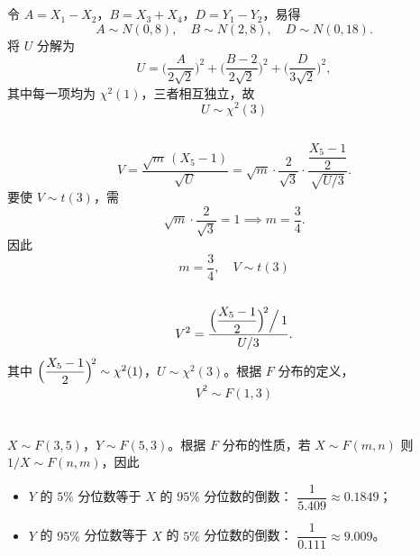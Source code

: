 \documentclass[12pt,a4paper]{article}
\begin{document}
\section{}

\subsection{}

令 $A=X_{1}-X_{2}$，$B=X_{3}+X_{4}$，$D=Y_{1}-Y_{2}$，易得
\[
  A\sim N(0,8),\quad B\sim N(2,8),\quad D\sim N(0,18).
\]
将 $U$ 分解为
\[
  U=\biggl(\frac{A}{2\sqrt{2}}\biggr)^{\!2}
   +\biggl(\frac{B-2}{2\sqrt{2}}\biggr)^{\!2}
   +\biggl(\frac{D}{3\sqrt{2}}\biggr)^{\!2},
\]
其中每一项均为 $\chi^{2}(1)$，三者相互独立，故
\[
  \boxed{U\sim\chi^{2}(3)}
\]

\subsection{}

\[
  V=\frac{\sqrt{m}\,(X_{5}-1)}{\sqrt{U}}
  =\sqrt{m}\cdot\frac{2}{\sqrt{3}}\cdot
   \frac{\dfrac{X_{5}-1}{2}}{\sqrt{U/3}}.
\]
要使 $V\sim t(3)$，需
\[
  \sqrt{m}\cdot\frac{2}{\sqrt{3}}=1
  \implies m=\frac{3}{4}.
\]
因此
\[
  \boxed{m=\frac{3}{4},\quad V\sim t(3)}
\]

\subsection{}

\[
  V^{2}=\frac{\Bigl(\dfrac{X_{5}-1}{2}\Bigr)^{\!2}\Big/\,1}{U/3}.
\]
其中 $\Bigl(\dfrac{X_{5}-1}{2}\Bigr)^{\!2}\sim\chi^{2}(1)$，$U\sim\chi^{2}(3)$。根据 $F$ 分布的定义，
\[
  \boxed{V^{2}\sim F(1,3)}
\]

\section{}

$X\sim F(3,5)$，$Y\sim F(5,3)$。根据 $F$ 分布的性质，若 $X\sim F(m,n)$ 则 $1/X\sim F(n,m)$，因此
\begin{itemize}[itemsep=4pt]
  \item $Y$ 的 $5\%$ 分位数等于 $X$ 的 $95\%$ 分位数的倒数：
    $\dfrac{1}{5.409}\approx\boxed{0.1849}$；
  \item $Y$ 的 $95\%$ 分位数等于 $X$ 的 $5\%$ 分位数的倒数：
    $\dfrac{1}{0.111}\approx\boxed{9.009}$。
\end{itemize}
\end{document}
